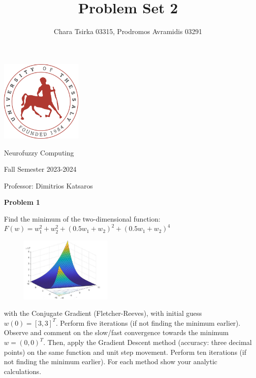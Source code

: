 \documentclass{article}
\title{\Huge Problem Set 2}
\author {\Large Chara Tsirka 03315, Prodromos Avramidis 03291}
\begin{document}
\maketitle
\begin{center}
\vspace{1cm}
\includegraphics[width=0.3\textwidth]{uthlogo.png}
\vspace{2cm}
\end{center}
\begin{center}
  \Huge Neurofuzzy Computing \vspace{1cm}

  \Large Fall Semester 2023-2024 \vspace{1cm}

  \Large Professor: Dimitrios Katsaros
\end{center}


\newpage
\noindent \textbf{Problem 1}

\noindent Find the minimum of the two-dimensional function: $F(w) = w_1^2+w_2^2+(0.5w_1+w_2)^2+(0.5w_1+w_2)^4$


\begin{figure}[h]
  \centering
  \includegraphics[width=0.4\textwidth]{pr1_a.png}
  
\end{figure}

\noindent with the Conjugate Gradient (Fletcher-Reeves), with initial guess $w(0)= [3, 3]^T$. Perform 
five iterations (if not finding the minimum earlier). Observe and comment on the 
slow/fast convergence towards the minimum $w=(0, 0)^T$. Then, apply the Gradient 
Descent method (accuracy: three decimal points) on the same function and unit step
movement. Perform ten iterations (if not finding the minimum earlier). For each method 
show your analytic calculations. \\ \\ \\
\end{document}
